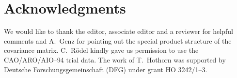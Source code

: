 \section*{Acknowledgments}

We would like to thank the editor, associate editor and
a reviewer for helpful comments and A.~Genz for pointing out the special
product structure of the covariance matrix. C.~R\"odel
kindly gave us permission to use the CAO/ARO/AIO--94 trial data.
The work of T.~Hothorn was supported by Deutsche Forschungsgemeinschaft (DFG) 
under grant HO 3242/1--3.
